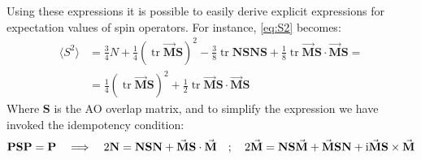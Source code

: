 \documentclass[12pt]{article}
\newcommand{\ev}[1]{\langle #1 \rangle}
\newcommand{\tr}{\operatorname{tr}}
\newcommand{\iu}{\ensuremath\mathrm{i}}
\begin{document}
Using these expressions it is possible to easily derive explicit expressions for expectation values of spin operators.
For instance, \cref{eq:S2} becomes:
\begin{equation}
\begin{split}
 \ev{S^2} &= \frac{3}{4}N + \frac{1}{4}(\tr\vec{\mathbf{M}}\mathbf{S})^2
          - \frac{3}{8}\tr\mathbf{NSNS} + \frac{1}{8}\tr\vec{\mathbf{M}}\mathbf{S}\cdot\vec{\mathbf{M}}\mathbf{S} =\\
          &= \frac{1}{4}(\tr\vec{\mathbf{M}}\mathbf{S})^2 + \frac{1}{2}\tr\vec{\mathbf{M}}\mathbf{S}\cdot\vec{\mathbf{M}}\mathbf{S}
\end{split}
\end{equation}
Where $\mathbf{S}$ is the AO overlap matrix, and to simplify the expression we have invoked the idempotency condition:
\begin{equation}
 \mathbf{PSP} = \mathbf{P} \quad\Longrightarrow\quad
 2\mathbf{N} = \mathbf{NSN} + \vec{\mathbf{M}}\mathbf{S}\cdot\vec{\mathbf{M}} \quad;\quad
 2\vec{\mathbf{M}} = \mathbf{NS}\vec{\mathbf{M}} + \vec{\mathbf{M}}\mathbf{SN} + \iu \vec{\mathbf{M}}\mathbf{S}\times\vec{\mathbf{M}}
\end{equation}

\end{document}
